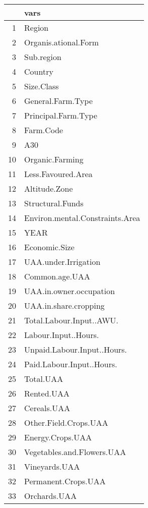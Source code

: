 \documentclass{article}\usepackage{graphicx, color}
\begin{document}
\begin{flushleft}
\clearpage
\begin{table}[ht]
\begin{center}
\begin{tabular}{rl}
  \hline
 & vars \\ 
  \hline
1 & Region \\ 
  2 & Organis.ational.Form \\ 
  3 & Sub.region \\ 
  4 & Country \\ 
  5 & Size.Class \\ 
  6 & General.Farm.Type \\ 
  7 & Principal.Farm.Type \\ 
  8 & Farm.Code \\ 
  9 & A30 \\ 
  10 & Organic.Farming \\ 
  11 & Less.Favoured.Area \\ 
  12 & Altitude.Zone \\ 
  13 & Structural.Funds \\ 
  14 & Environ.mental.Constraints.Area \\ 
  15 & YEAR \\ 
  16 & Economic.Size \\ 
  17 & UAA.under.Irrigation \\ 
  18 & Common.age.UAA \\ 
  19 & UAA.in.owner.occupation \\ 
  20 & UAA.in.share.cropping \\ 
  21 & Total.Labour.Input..AWU. \\ 
  22 & Labour.Input..Hours. \\ 
  23 & Unpaid.Labour.Input..Hours. \\ 
  24 & Paid.Labour.Input..Hours. \\ 
  25 & Total.UAA \\ 
  26 & Rented.UAA \\ 
  27 & Cereals.UAA \\ 
  28 & Other.Field.Crops.UAA \\ 
  29 & Energy.Crops.UAA \\ 
  30 & Vegetables.and.Flowers.UAA \\ 
  31 & Vineyards.UAA \\ 
  32 & Permanent.Crops.UAA \\ 
  33 & Orchards.UAA \\ 

\end{tabular}
\end{center}
\end{table}
\end{flushleft}
\end{document}
